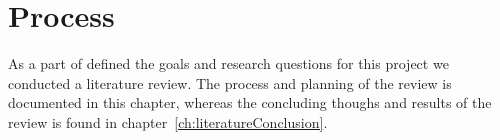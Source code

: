 \section{Process}\label{ch:literatureProcess}
As a part of defined the goals and research questions for this project we conducted a literature review. The process and planning of the review is documented in this chapter, whereas the concluding thoughs and results of the review is found in chapter~\ref{ch:literatureConclusion}. 

	
